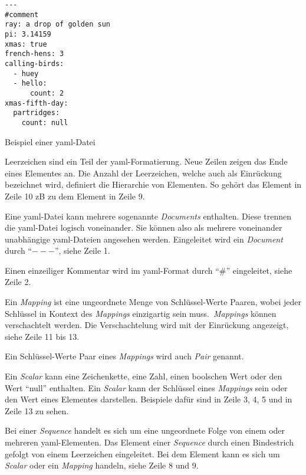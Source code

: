 \begin{listing}[htp]
      \begin{verbatim}
---
#comment
ray: a drop of golden sun
pi: 3.14159
xmas: true
french-hens: 3
calling-birds:
  - huey
  - hello:
      count: 2
xmas-fifth-day:
  partridges:
    count: null
      \end{verbatim}
      \caption{Beispiel einer \acs{yaml}-Datei}
      \label{lst:yaml-example}
\end{listing}

\begin{description}
      \setlength\itemsep{-0.5cm}
      \item[Einrückung und Leerzeichen]
            Leerzeichen sind ein Teil der \acs{yaml}-Formatierung. Neue Zeilen zeigen das Ende eines Elementes an.
            Die Anzahl der Leerzeichen, welche auch als Einrückung bezeichnet wird, definiert die Hierarchie von Elementen.
            So gehört das Element in Zeile 10 \ac{zB} zu dem Element in Zeile 9.
      \item[Document]
            Eine \ac{yaml}-Datei kann mehrere sogenannte \textit{Documents} enthalten. Diese trennen die \ac{yaml}-Datei logisch voneinander.
            Sie können also als mehrere voneinander unabhängige \ac{yaml}-Dateien angesehen werden.
            Eingeleitet wird ein \textit{Document}
            durch ``$---$'', siehe Zeile 1.
      \item[Kommentare]
            Einen einzeiliger Kommentar wird im \ac{yaml}-Format durch ``$\#$'' eingeleitet, siehe Zeile 2.
      \item[Mapping]
            Ein \textit{Mapping} ist eine ungeordnete Menge von Schlüssel-Werte Paaren, wobei jeder Schlüssel
            in Kontext des \textit{Mappings} einzigartig sein muss.\ \textit{Mappings} können verschachtelt werden.
            Die Verschachtelung wird mit der Einrückung angezeigt, siehe Zeile 11 bis 13.
      \item[Pair]
            Ein Schlüssel-Werte Paar eines \textit{Mappings} wird auch \textit{Pair} genannt.
      \item[Scalar]
            Ein \textit{Scalar} kann eine Zeichenkette, eine Zahl, einen boolschen Wert oder den Wert ``null'' enthalten.
            Ein \textit{Scalar} kann der Schlüssel eines \textit{Mappings} sein oder den Wert eines Elementes darstellen.
            Beispiele dafür sind in Zeile 3, 4, 5 und in Zeile 13 zu sehen.
      \item[Sequence]
            Bei einer \textit{Sequence} handelt es sich um eine ungeordnete Folge von einem oder mehreren \ac{yaml}-Elementen.
            Das Element einer \textit{Sequence} durch einen Bindestrich gefolgt von einem Leerzeichen eingeleitet.
            Bei dem Element kann es sich um \textit{Scalar} oder ein \textit{Mapping} handeln, siehe Zeile 8 und 9.

\end{description}


